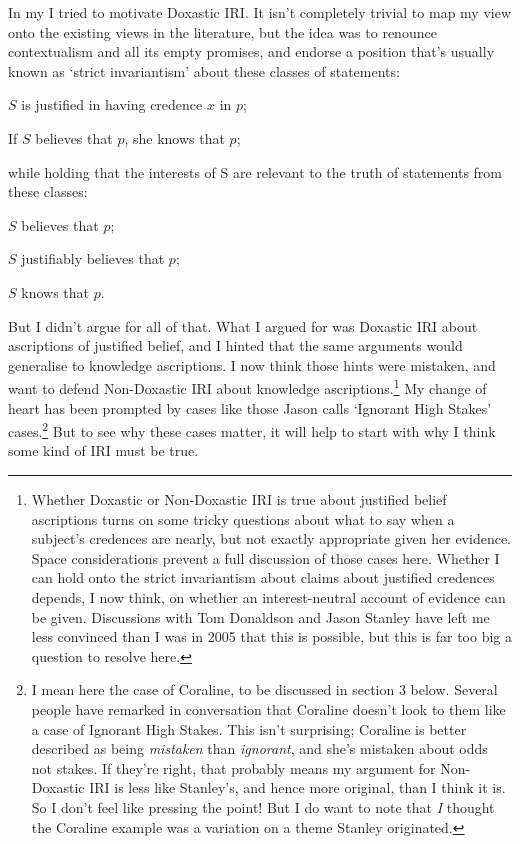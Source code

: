 In my \cite{Weatherson2005-WEACWD} I tried to motivate Doxastic IRI. It isn't completely trivial to map my view onto the existing views in the literature, but the idea was to renounce contextualism and all its empty promises, and endorse a position that's usually known as `strict invariantism' about these classes of statements:
\begin{itemize*}
\item $S$ is justified in having credence $x$ in $p$;
\item	If $S$ believes that $p$, she knows that $p$;
\end{itemize*}
\noindent while holding that the interests of S are relevant to the truth of statements from these classes:
\begin{itemize*}
\item $S$ believes that $p$;
\item $S$ justifiably believes that $p$;
\item $S$ knows that $p$.
\end{itemize*}

\noindent But I didn't argue for all of that. What I argued for was Doxastic IRI about ascriptions of justified belief, and I hinted that the same arguments would generalise to knowledge ascriptions. I now think those hints were mistaken, and want to defend Non-Doxastic IRI about knowledge ascriptions.\footnote{Whether Doxastic or Non-Doxastic IRI is true about justified belief ascriptions turns on some tricky questions about what to say when a subject's credences are nearly, but not exactly appropriate given her evidence. Space considerations prevent a full discussion of those cases here. Whether I can hold onto the strict invariantism about claims about justified credences depends, I now think, on whether an interest-neutral account of evidence can be given. Discussions with Tom Donaldson and Jason Stanley have left me less convinced than I was in 2005 that this is possible, but this is far too big a question to resolve here.} My change of heart has been prompted by cases like those Jason \cite{Stanley2005-STAKAP} calls `Ignorant High Stakes' cases.\footnote{I mean here the case of Coraline, to be discussed in section 3 below. Several people have remarked in conversation that Coraline doesn't look to them like a case of Ignorant High Stakes. This isn't surprising; Coraline is better described as being \textit{mistaken} than \textit{ignorant}, and she's mistaken about odds not stakes. If they're right, that probably means my argument for Non-Doxastic IRI is less like Stanley's, and hence more original, than I think it is. So I don't feel like pressing the point! But I do want to note that \textit{I} thought the Coraline example was a variation on a theme Stanley originated.} But to see why these cases matter, it will help to start with why I think some kind of IRI must be true. 


